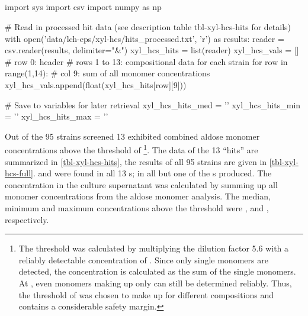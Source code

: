 \subsection{\AMC{}\label{xyl-hcs-subsec-amc}}
\begin{pycode}
import sys
import csv
import numpy as np

# Read in processed hit data (see description table tbl-xyl-hcs-hits for details)
with open('data/lch-eps/xyl-hcs/hits_processed.txt', 'r') as results:
    reader = csv.reader(results, delimiter="&")
    xyl_hcs_hits = list(reader)
    xyl_hcs_vals = []
    # row 0: header
    # rows 1 to 13: compositional data for each strain
    for row in range(1,14):
        # col 9: sum of all monomer concentrations
        xyl_hcs_vals.append(float(xyl_hcs_hits[row][9]))

# Save to variables for later retrieval
xyl_hcs_hits_med = ''
xyl_hcs_hits_min = ''
xyl_hcs_hits_max = ''
\end{pycode}
Out of the \num{95} strains screened \num{13} exhibited combined aldose monomer concentrations above the threshold of \footnote{The threshold was calculated by multiplying the dilution factor \num{5.6} with a reliably detectable \eps{} concentration of . Since only single monomers are detected, the \eps{} concentration is calculated as the sum of the single monomers. At , even monomers making up  only can still be determined reliably. Thus, the threshold of  was chosen to make up for different \eps{} compositions and contains a considerable safety margin.}. The data of the 13 \enquote{hits} are summarized in \vref{tbl-xyl-hcs-hits}, the results of all \num{95} strains are given in \vref{tbl-xyl-hcs-full}. \GAL{} and \rha{} were found in all 13 \eps{}s; \glc{} in all but one of the \eps{}s produced. The \eps{} concentration in the culture supernatant was calculated by summing up all monomer concentrations from the aldose monomer analysis. The median, minimum and maximum \eps{} concentrations above the threshold were ,  and , respectively.

